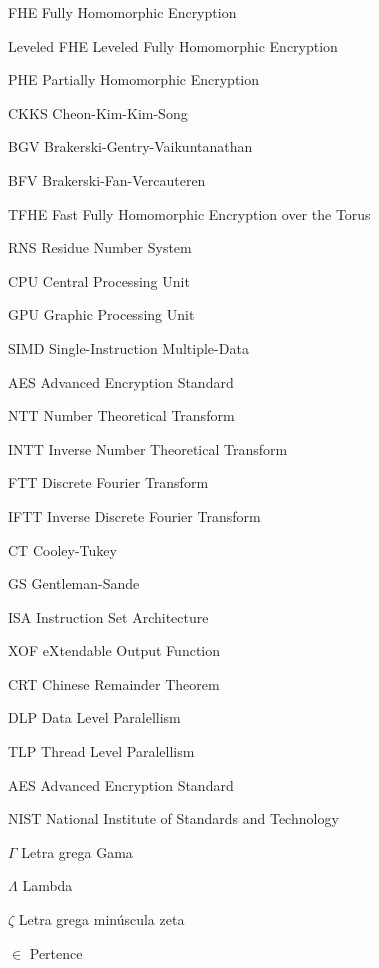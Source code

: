 \documentclass[
	12pt,				%
	openright,			%
	twoside,			%
	a4paper,			%
	english,			%
	french,				%
	spanish,			%
	brazil				%
	]{abntex2}
\begin{document}
\begin{siglas}
  \item[FHE] Fully Homomorphic Encryption
  \item[Leveled FHE] Leveled Fully Homomorphic Encryption
  \item[PHE] Partially Homomorphic Encryption
  \item[CKKS] Cheon-Kim-Kim-Song
  \item[BGV] Brakerski-Gentry-Vaikuntanathan
  \item[BFV] Brakerski-Fan-Vercauteren
  \item[TFHE] Fast Fully Homomorphic Encryption over the Torus
  \item[RNS] Residue Number System
  \item[CPU] Central Processing Unit
  \item[GPU] Graphic Processing Unit
  \item[SIMD] Single-Instruction Multiple-Data 
  \item[AES] Advanced Encryption Standard
  \item[NTT] Number Theoretical Transform
  \item[INTT] Inverse Number Theoretical Transform
  \item[FTT] Discrete Fourier Transform
  \item[IFTT] Inverse Discrete Fourier Transform
  \item[CT] Cooley-Tukey
  \item[GS] Gentleman-Sande
  \item[ISA] Instruction Set Architecture
  \item[XOF] eXtendable Output Function
  \item[CRT] Chinese Remainder Theorem
  \item[DLP] Data Level Paralellism
  \item[TLP] Thread Level Paralellism
  \item[AES] Advanced Encryption Standard
  \item[NIST] National Institute of Standards and Technology
\end{siglas}

\begin{simbolos}
  \item[$ \Gamma $] Letra grega Gama
  \item[$ \Lambda $] Lambda
  \item[$ \zeta $] Letra grega minúscula zeta
  \item[$ \in $] Pertence
\end{simbolos}
\end{document}
